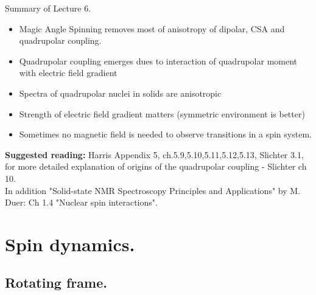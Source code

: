 \documentclass{beamer}
\begin{document}
\begin{frame}{Summary of Lecture 6.}
	\begin{itemize}[<+>]
		\item 	Magic Angle Spinning removes most of anisotropy of dipolar, CSA and quadrupolar coupling.
		\item Quadrupolar coupling emerges dues to interaction of quadrupolar moment with electric field gradient
		\item Spectra of quadrupolar nuclei in solids are anisotropic
		\item Strength of electric field gradient matters (symmetric environment is better)
		\item Sometimes no magnetic field is needed to observe transitions in a spin system.
	\end{itemize}
	
    \textbf{Suggested reading:}  Harris  Appendix 5, ch.5.9,5.10,5.11,5.12,5.13, Slichter 3.1, for more detailed explanation of origins of the quadrupolar coupling - Slichter ch 10.\\
    In addition "Solid-state NMR Spectroscopy Principles and Applications" by M. Duer: Ch 1.4 "Nuclear spin interactions".
    
\end{frame}


\section{Spin dynamics.}
\subsection{Rotating frame.}
\end{document}
